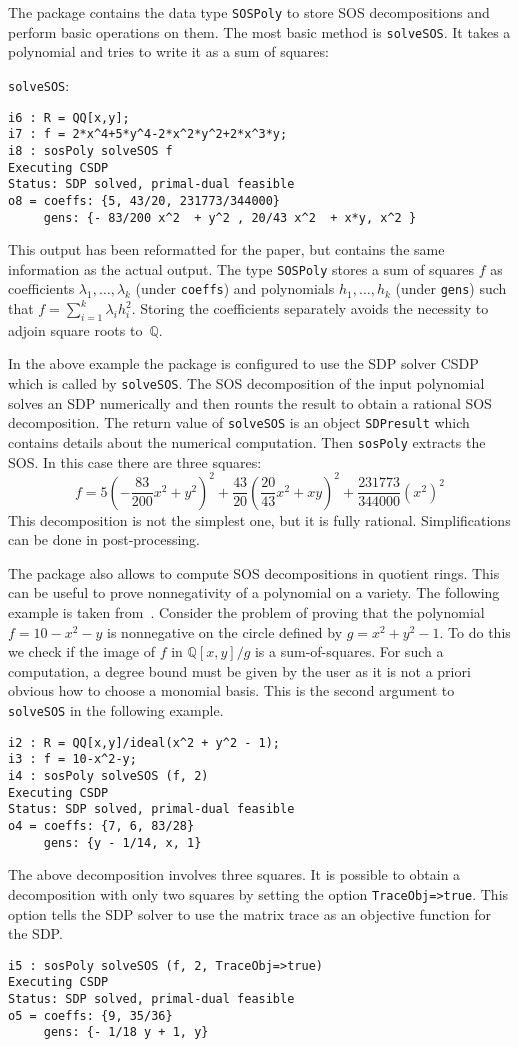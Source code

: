 \documentclass[11pt]{amsart}
\theoremstyle{plain}%
\theoremstyle{definition}
\theoremstyle{remark}
\newcommand{\QQ}{\mathbb{Q}}
\begin{document}
The package contains the data type \verb|SOSPoly| to store SOS decompositions and perform basic operations on them.
The most basic method is \verb|solveSOS|.
It takes a polynomial and tries to write it as a sum of squares:
{\small
\verb|solveSOS|:
\begin{verbatim}
i6 : R = QQ[x,y];
i7 : f = 2*x^4+5*y^4-2*x^2*y^2+2*x^3*y;
i8 : sosPoly solveSOS f
Executing CSDP
Status: SDP solved, primal-dual feasible
o8 = coeffs: {5, 43/20, 231773/344000}              
     gens: {- 83/200 x^2  + y^2 , 20/43 x^2  + x*y, x^2 }
\end{verbatim}
}
This output has been reformatted for the paper, but contains the same information as the actual output.
The type \verb|SOSPoly| stores a sum of squares $f$ as coefficients $\lambda_{1},\dots,\lambda_{k}$ (under \verb|coeffs|) and polynomials $h_{1},\dots,h_{k}$ (under \verb|gens|) such that $f = \sum_{i=1}^{k}\lambda_{i}h_{i}^{2}$.
Storing the coefficients separately avoids the necessity to adjoin square roots to~$\QQ$.

In the above example the package is configured to use the SDP solver CSDP which is called by \verb|solveSOS|.
The SOS decomposition of the input polynomial solves an SDP numerically and then rounts the result to obtain a rational SOS decomposition.
The return value of \verb|solveSOS| is an object \verb|SDPresult| which contains details about the numerical computation.
Then \verb|sosPoly| extracts the SOS.
In this case there are three squares:
\[
  f = 5(-\frac{83}{200} x^{2}+y^{2})^{2} + \frac{43}{20}
  (\frac{20}{43}x^{2} + xy)^{2} + \frac{231773}{344000} (x^{2})^{2}
\]
This decomposition is not the simplest one, but it is fully rational. 
Simplifications can be done in post-processing.

The package also allows to compute SOS decompositions in quotient rings.
This can be useful to prove nonnegativity of a polynomial on a variety.  
The following example is taken from~\cite{parrilo2005exploiting}.  
Consider the problem of proving that the polynomial $f = 10-x^2-y$ is nonnegative on the circle defined by $g = x^2 + y^2 - 1$.
To do this we check if the image of $f$ in $\QQ[x,y]/g$ is a sum-of-squares.
For such a computation, a degree bound must be given by the user as it is not a priori obvious how to choose a monomial basis.
This is the second argument to \verb|solveSOS| in the following example.
{\small
\begin{verbatim}
i2 : R = QQ[x,y]/ideal(x^2 + y^2 - 1);
i3 : f = 10-x^2-y;
i4 : sosPoly solveSOS (f, 2)
Executing CSDP
Status: SDP solved, primal-dual feasible
o4 = coeffs: {7, 6, 83/28}      
     gens: {y - 1/14, x, 1}
\end{verbatim}
}
The above decomposition involves three squares.
It is possible to obtain a decomposition with only two squares by setting the option \verb|TraceObj=>true|.
This option tells the SDP solver to use the matrix trace as an objective function for the SDP.
{\small
\begin{verbatim}
i5 : sosPoly solveSOS (f, 2, TraceObj=>true)
Executing CSDP
Status: SDP solved, primal-dual feasible
o5 = coeffs: {9, 35/36}      
     gens: {- 1/18 y + 1, y} 
\end{verbatim}
}
\end{document}
